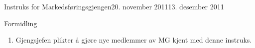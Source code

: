 \documentclass[../fsbok.tex]{subfiles}
\begin{document}
\begin{instruks}{Instruks for Markedsføringsgjengen}{20. november 2011}{13. desember 2011 }
    \begin{instruksledd}{Formidling}
        \begin{enumerate}
            \item Gjengsjefen plikter å gjøre nye medlemmer av MG kjent med denne instruks.
        \end{enumerate}
    \end{instruksledd}


\end{instruks}
\end{document}
